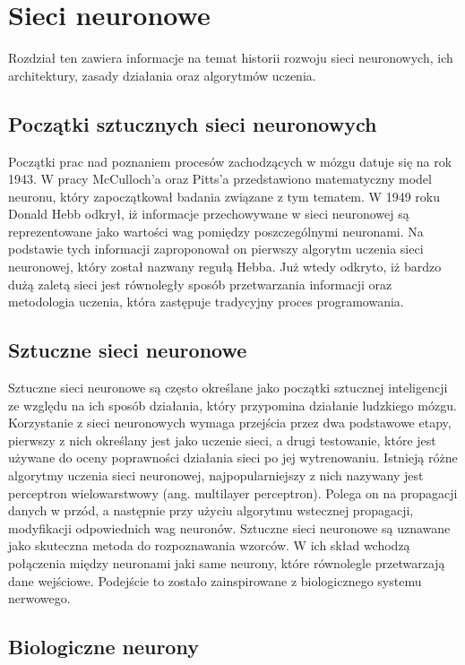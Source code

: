 \chapter{Sieci neuronowe}
\label{cha:sztuczne_sieci_neuronowe}

Rozdział ten zawiera informacje na temat historii rozwoju sieci neuronowych, ich architektury, zasady działania oraz algorytmów uczenia.

\section{Początki sztucznych sieci neuronowych}
Początki prac nad poznaniem procesów zachodzących w mózgu datuje się na rok 1943. W pracy McCulloch'a oraz Pitts'a przedstawiono matematyczny model neuronu, który zapoczątkował badania związane z tym tematem. W 1949 roku Donald Hebb odkrył, iż informacje przechowywane w sieci neuronowej są reprezentowane jako wartości wag pomiędzy poszczególnymi neuronami. Na podstawie tych informacji zaproponował on pierwszy algorytm uczenia sieci neuronowej, który został nazwany regułą Hebba. Już wtedy odkryto, iż bardzo dużą zaletą sieci jest równoległy sposób przetwarzania informacji oraz metodologia uczenia, która zastępuje tradycyjny proces programowania. 

\section{Sztuczne sieci neuronowe}
Sztuczne sieci neuronowe są często określane jako początki sztucznej inteligencji ze względu na ich sposób działania, który przypomina działanie ludzkiego mózgu. Korzystanie z sieci neuronowych wymaga przejścia przez dwa podstawowe etapy, pierwszy z nich określany jest jako uczenie sieci, a drugi testowanie, które jest używane do oceny poprawności działania sieci po jej wytrenowaniu. Istnieją różne algorytmy uczenia sieci neuronowej, najpopularniejszy z nich nazywany jest perceptron wielowarstwowy (ang. multilayer perceptron). Polega on na 
propagacji danych w przód, a następnie przy użyciu algorytmu wstecznej propagacji, modyfikacji odpowiednich wag neuronów. Sztuczne sieci neuronowe są uznawane jako skuteczna metoda do rozpoznawania wzorców. W ich skład wchodzą połączenia między neuronami jaki same neurony, które równolegle przetwarzają dane wejściowe. Podejście to zostało zainspirowane z biologicznego systemu nerwowego.

\section{Biologiczne neurony}

